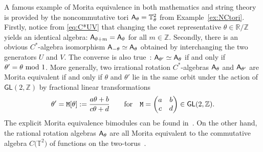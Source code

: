 \documentclass[10pt,a4paper]{amsart}
\numberwithin{equation}{section}
\newcommand{\Z}{\zed}
\def\A{{\sf A}}
\newcommand{\sfGL}{\mathsf{GL}}
\newcommand{\zed}{{\mathbb Z}} %
\newcommand{\real}{{\mathbb R}} %
\newcommand{\torus}{{\mathbb T}} %
\begin{document}
\begin{Example}\label{ex:NCT2Morita}
A famous example of Morita equivalence in both mathematics and string
theory is provided by the
noncommutative tori ${\sf A}_\theta=\torus_\theta^2$ from
Example~\ref{ex:NCtori}. Firstly, notice from \eqref{eq:C*UV} that
changing the coset representative $\theta\in\real/\Z$ yields an identical
algebra: $\A_{\theta+m}=\A_{\theta}$ for all $m\in\Z$. Secondly, there
is an obvious
$C^*$-algebra isomorphism $\A_{-\theta}\simeq\A_\theta$ obtained by
interchanging the two generators $U$ and $V$. The converse
is also true~\cite{Rieffel1981,Rieffel1982}:
$\A_{\theta'}\simeq\A_{\theta}$ if and only if $\theta'=\theta \ {\rm
 mod}~1$. More generally, two irrational rotation $C^*$-algebras
$\A_\theta$ and $\A_{\theta'}$ are
Morita equivalent if and only if $\theta$ and $\theta'$ lie in the
same orbit under the action of $\sfGL(2,\Z)$ by fractional linear
transformations
\[
\theta'={\tt M}[\theta]:=\frac{a \theta+b}{c \theta+d} \qquad
\mbox{for} \quad {\tt M}=\bigg(\begin{matrix} a & b \\ c &
 d \end{matrix}\bigg) \in \sfGL(2,\Z) .
\]
The explicit Morita equivalence bimodules can be found
in~\cite{Rieffel1981}. On the other hand, the rational rotation
algebras $\A_\theta$ are all Morita equivalent to the commutative
algebra $C\big(\torus^2\big)$ of functions on the
two-torus~\cite{Rieffel1982}.
\end{Example}
\end{document}

